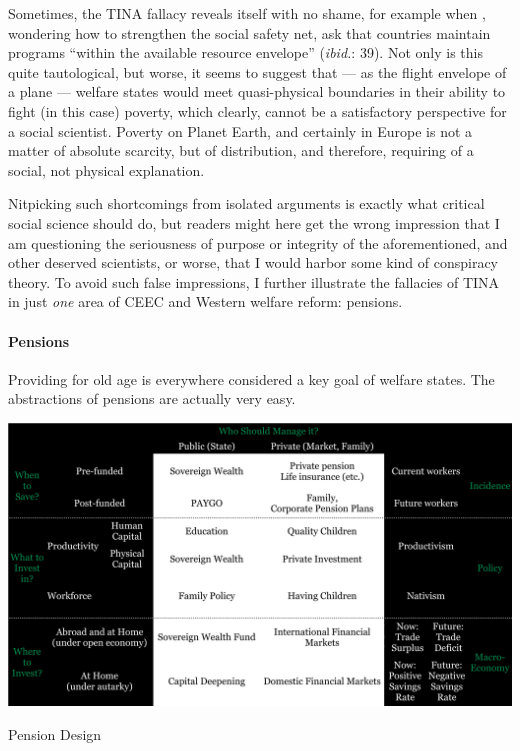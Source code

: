 \documentclass[11pt,a4paper,oneside,openright]{article}
\begin{document}
Sometimes, the TINA fallacy reveals itself with no shame, for example when \cite{Grow2005}, wondering how to strengthen the social safety net, ask that countries maintain programs ``within the available resource envelope'' (\emph{ibid.}: 39). 
Not only is this quite tautological, but worse, it seems to suggest that --- as the flight envelope of a plane --- welfare states would meet quasi-physical boundaries in their ability to fight (in this case) poverty, which clearly, cannot be a satisfactory perspective for a social scientist. 
Poverty on Planet Earth, and certainly in Europe is not a matter of absolute scarcity, but of distribution, and therefore, requiring of a social, not physical explanation.

Nitpicking such shortcomings from isolated arguments is exactly what critical social science should do, but readers might here get the wrong impression that I am questioning the seriousness of purpose or integrity of the aforementioned, and other deserved scientists, or worse, that I would harbor some kind of conspiracy theory. 
To avoid such false impressions, I further illustrate the fallacies of TINA in just \emph{one} area of \gls{CEEC} and Western welfare reform: 
pensions. 

\paragraph{Pensions}  \label{sec:pensions}
Providing for old age is everywhere considered a key goal of welfare states. 
The abstractions of pensions are actually very easy. 

 \begin{table}[htbp]
	\centering
	\includegraphics[width=1\linewidth]{./img/pension-design}  
	\caption{Pension Design}
	\label{tab:pension-design}
\end{table}%
\end{document}
